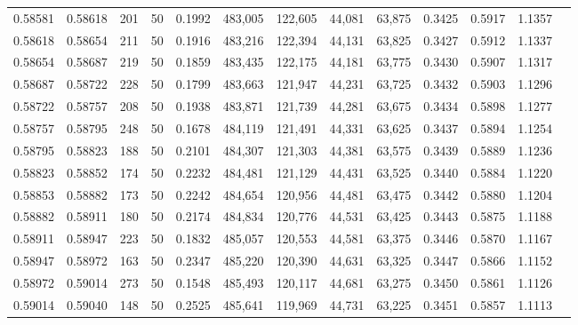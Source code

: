 \begin{tabular}{rrrrrrrrrrrrr}
0.58581 & 0.58618 &   201 &  50 &                                     0.1992 & 483,005 & 122,605 &  44,081 &  63,875 & 0.3425 & 0.5917 & 1.1357 \\
0.58618 & 0.58654 &   211 &  50 &                                     0.1916 & 483,216 & 122,394 &  44,131 &  63,825 & 0.3427 & 0.5912 & 1.1337 \\
0.58654 & 0.58687 &   219 &  50 &                                     0.1859 & 483,435 & 122,175 &  44,181 &  63,775 & 0.3430 & 0.5907 & 1.1317 \\
0.58687 & 0.58722 &   228 &  50 &                                     0.1799 & 483,663 & 121,947 &  44,231 &  63,725 & 0.3432 & 0.5903 & 1.1296 \\
0.58722 & 0.58757 &   208 &  50 &                                     0.1938 & 483,871 & 121,739 &  44,281 &  63,675 & 0.3434 & 0.5898 & 1.1277 \\
0.58757 & 0.58795 &   248 &  50 &                                     0.1678 & 484,119 & 121,491 &  44,331 &  63,625 & 0.3437 & 0.5894 & 1.1254 \\
0.58795 & 0.58823 &   188 &  50 &                                     0.2101 & 484,307 & 121,303 &  44,381 &  63,575 & 0.3439 & 0.5889 & 1.1236 \\
0.58823 & 0.58852 &   174 &  50 &                                     0.2232 & 484,481 & 121,129 &  44,431 &  63,525 & 0.3440 & 0.5884 & 1.1220 \\
0.58853 & 0.58882 &   173 &  50 &                                     0.2242 & 484,654 & 120,956 &  44,481 &  63,475 & 0.3442 & 0.5880 & 1.1204 \\
0.58882 & 0.58911 &   180 &  50 &                                     0.2174 & 484,834 & 120,776 &  44,531 &  63,425 & 0.3443 & 0.5875 & 1.1188 \\
0.58911 & 0.58947 &   223 &  50 &                                     0.1832 & 485,057 & 120,553 &  44,581 &  63,375 & 0.3446 & 0.5870 & 1.1167 \\
0.58947 & 0.58972 &   163 &  50 &                                     0.2347 & 485,220 & 120,390 &  44,631 &  63,325 & 0.3447 & 0.5866 & 1.1152 \\
0.58972 & 0.59014 &   273 &  50 &                                     0.1548 & 485,493 & 120,117 &  44,681 &  63,275 & 0.3450 & 0.5861 & 1.1126 \\
0.59014 & 0.59040 &   148 &  50 &                                     0.2525 & 485,641 & 119,969 &  44,731 &  63,225 & 0.3451 & 0.5857 & 1.1113 \\

\end{tabular}
